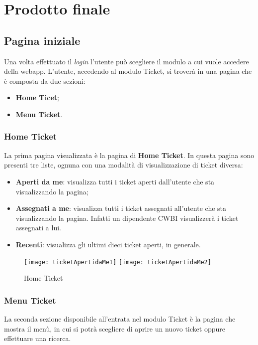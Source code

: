 \chapter{Prodotto finale}
\label{cap:prodotto finale}

\section{Pagina iniziale}
Una volta effettuato il \textit{login} l'utente può scegliere il modulo a cui vuole accedere della webapp. L'utente, accedendo al modulo Ticket, si troverà in una pagina che è composta da due sezioni:
\begin{itemize}
\item \textbf{Home Ticet};
\item \textbf{Menu Ticket}.
\end{itemize}

\subsection{Home Ticket}
La prima pagina visualizzata è la pagina di \textbf{Home Ticket}. In questa pagina sono presenti tre liste, ognuna con una modalità di visualizzazione di ticket diversa:
\begin{itemize}
\item \textbf{Aperti da me}: visualizza tutti i ticket aperti dall'utente che sta visualizzando la pagina;
\item \textbf{Assegnati a me}: visualizza tutti i ticket assegnati all'utente che sta visualizzando la pagina. Infatti un dipendente CWBI visualizzerà i ticket assegnati a lui.
\item \textbf{Recenti}: visualizza gli ultimi dieci ticket aperti, in generale.
\end{itemize}

\begin{figure}[H]
	\centering
    \texttt{[image: ticketApertidaMe1]} 
    \texttt{[image: ticketApertidaMe2]} 
    \caption{Home Ticket}
\end{figure}

\subsection{Menu Ticket}
La seconda sezione disponibile all'entrata nel modulo Ticket è la pagina che mostra il menù, in cui si potrà scegliere di aprire un nuovo ticket oppure effettuare una ricerca.
 
